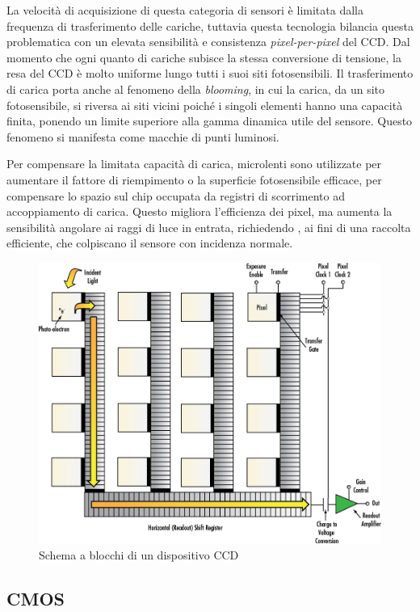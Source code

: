 La velocità di acquisizione di questa categoria di sensori è limitata dalla
frequenza di trasferimento delle cariche, tuttavia questa tecnologia bilancia questa problematica con un elevata
sensibilità e consistenza \emph{pixel-per-pixel} del CCD. Dal momento che ogni quanto
di cariche subisce la stessa conversione di tensione, la resa del CCD è molto
uniforme lungo tutti i suoi siti fotosensibili. Il trasferimento di carica
porta anche al fenomeno della \emph{blooming}, in cui la carica, da un sito
fotosensibile, si riversa ai siti vicini poiché i singoli elementi hanno una
capacità finita, ponendo un limite superiore alla gamma dinamica
utile del sensore. Questo fenomeno si manifesta come macchie di punti
luminosi.

Per compensare la limitata capacità di carica, microlenti sono utilizzate per
aumentare il fattore di riempimento o la superficie fotosensibile efficace,
per compensare lo spazio sul chip occupata da registri di scorrimento ad
accoppiamento di carica. Questo migliora l'efficienza dei pixel, ma aumenta la
sensibilità angolare ai raggi di luce in entrata, richiedendo , ai fini di una raccolta efficiente, che colpiscano il sensore con incidenza normale.



\begin{figure}[!ht]
\centering

\includegraphics[width=.6\textwidth]{img/ccd-blockdiagram.jpeg}

\caption{Schema a blocchi di un dispositivo CCD}
\label{fig:ccd-blockdiagram}
\end{figure}

\subsection{CMOS}


